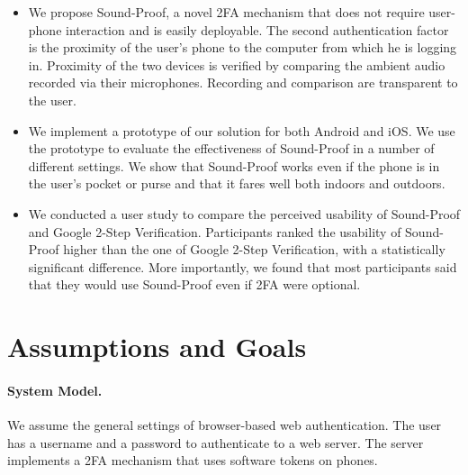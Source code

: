 \begin{itemize}
\item   We propose Sound-Proof, a novel 2FA mechanism that does not require user-phone interaction and is easily deployable.
        The second authentication factor is the proximity of the user's phone to the computer from which he is logging in.
        Proximity of the two devices is verified by comparing the ambient audio recorded via their microphones. Recording and comparison are transparent to the user.

\item   We implement a prototype of our solution for both Android and iOS. We use the prototype to evaluate the effectiveness of Sound-Proof in a number of different settings.
        We show that Sound-Proof works even if the phone is in the user's pocket or purse and that it fares well both indoors and outdoors.

\item   We conducted a user study to compare the perceived usability of Sound-Proof and Google 2-Step Verification.
        Participants ranked the usability of Sound-Proof higher than the one of Google 2-Step Verification, with a statistically significant difference.
        More importantly, we found that most participants said that they would use Sound-Proof even if 2FA were optional.
\end{itemize}

\section{Assumptions and Goals}
\label{sec:ps_sp_goals}

\paragraph{System Model.}
We assume the general settings of browser-based web authentication.
The user has a username and a password to authenticate to a web server.
The server implements a 2FA mechanism that uses software tokens on phones.

